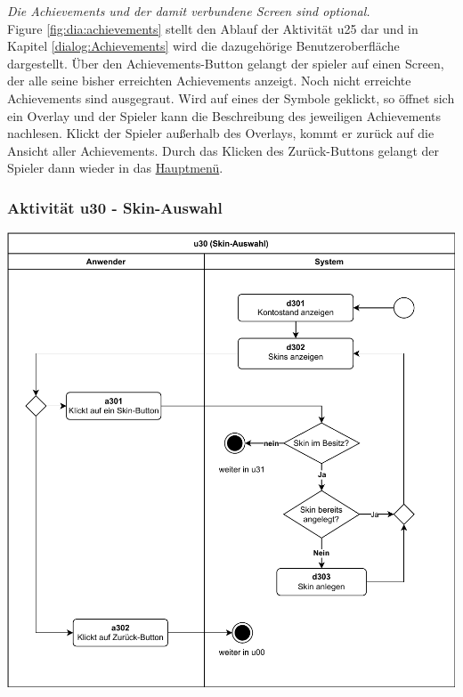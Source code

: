 \textit{Die Achievements und der damit verbundene Screen sind optional.}
\\
Figure \ref{fig:dia:achievements} stellt den Ablauf der Aktivität u25 dar und in Kapitel \ref{dialog:Achievements} wird die dazugehörige Benutzeroberfläche dargestellt.
Über den Achievements-Button gelangt der \gls{spieler} auf einen Screen, der alle seine bisher erreichten Achievements anzeigt. Noch nicht erreichte Achievements sind ausgegraut. Wird auf eines der Symbole geklickt, so öffnet sich ein Overlay und der Spieler kann die Beschreibung des jeweiligen Achievements nachlesen. Klickt der Spieler außerhalb des Overlays, kommt er zurück auf die Ansicht aller Achievements. Durch das Klicken des Zurück-Buttons gelangt der Spieler dann wieder in das \hyperref[fig:dia:mainMenu]{Hauptmenü}. 

\clearpage

\subsubsection{Aktivität u30 - Skin-Auswahl}

\vspace*{1cm}

\includegraphics[width=\linewidth]{diagramme/pdf/UML-Activity-u30.pdf}
\label{fig:dia:skins}
\vspace*{0.5cm}

